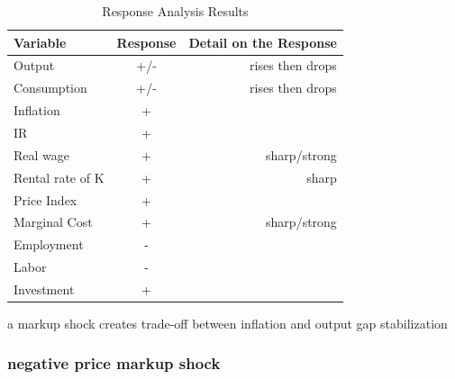 \documentclass{article}
\begin{document}
\begin{table}[H]    
    \centering  
    \begin{threeparttable}    
    \caption{Response Analysis Results}    
    \label{tab:response_analysis}    
    \begin{tabular}{lcr}    
        \toprule    
        \textbf{Variable} & \textbf{Response} & \textbf{Detail on the Response} \\    
        \midrule    
        Output\tnote{a} & +/- & rises then drops  \\    
        Consumption & +/- & rises then drops  \\ 
        Inflation \tnote{a} & + & \\ 
        IR\tnote{a} & + & \\   
        Real wage & + & sharp/strong \\  
        Rental rate of K & + & sharp \\
        Price Index & + & \\
        Marginal Cost & + & sharp/strong \\
        Employment & - &  \\  
        Labor & - & \\
        Investment & + & \\
        \bottomrule    
    \end{tabular}  
    \begin{tablenotes}  
        \small  
        \item[a] markup shock creates trade-off between inflation and output gap stabilization
    \end{tablenotes}  
    \end{threeparttable}    
\end{table} 


\subsubsection{negative price markup shock}
\end{document}
